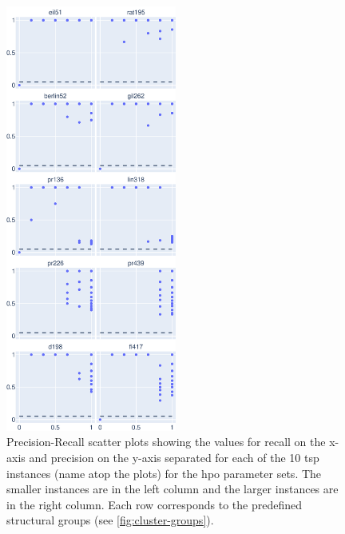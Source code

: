 \begin{figure}[h]
	\centering
	\includegraphics[width=0.5\textwidth]{results/part3/pr_curve_cmp_problem_grouped_False_HPO.svg}
	\caption[Precision-Recall scatter plots separated by \gls{tsp} instance for the \gls{hpo} parameter sets]{Precision-Recall scatter plots showing the values for recall on the x-axis and precision on the y-axis separated for each of the 10 \gls{tsp} instances (name atop the plots) for the \gls{hpo} parameter sets. The smaller instances are in the left column and the larger instances are in the right column. Each row corresponds to the predefined structural groups (see \cref{fig:cluster-groups}).}
	\label{fig:pr_curve_cmp_problem_HPO}
\end{figure}
